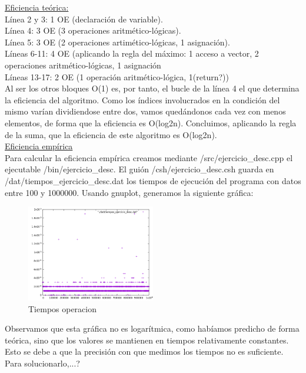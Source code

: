\documentclass[titlepage, 12pt,a4paper]{article}
\begin{document}
	\underline{Eficiencia teórica:} \\
	Línea 2 y 3: 1 OE (declaración de variable).\\
	Línea 4: 3 OE (3 operaciones aritmético-lógicas).\\
	Línea 5: 3 OE (2 operaciones artimético-lógicas, 1 asignación).\\
	Líneas 6-11: 4 OE (aplicando la regla del máximo: 1 acceso a vector, 2 operaciones aritmético-lógicas, 1 asignación\\
	Líneas 13-17: 2 OE (1 operación aritmético-lógica, 1(return?))\\

	Al ser los otros bloques O(1) es, por tanto, el bucle de la línea 4 el que determina la eficiencia del algoritmo. Como los índices involucrados en la condición del mismo varían dividiendose entre dos, vamos quedándonos cada vez con menos elementos, de forma que la eficiencia es O(log2n). Concluimos, aplicando la regla de la suma, que la eficiencia de este algoritmo es O(log2n).\\
	
	\underline{Eficiencia empírica} \\
	Para calcular la eficiencia empírica creamos mediante /src/ejercicio\_desc.cpp el ejecutable /bin/ejercicio\_desc. El guión /csh/ejercicio\_desc.csh guarda en /dat/tiempos\_ejercicio\_desc.dat los tiempos de ejecución del programa con datos entre 100 y 1000000. Usando gnuplot, generamos la siguiente gráfica:
	
	\begin{figure}[!ht]
  \caption{Tiempos operacion}
  \centering
    \includegraphics[width=0.5\textwidth]{./img/ef_pract_ej_3.png}
\end{figure}
	
	Observamos que esta gráfica no es logarítmica, como habíamos predicho de forma teórica, sino que los valores se mantienen en tiempos relativamente constantes. Esto se debe a que la precisión con que medimos los tiempos no es suficiente. Para solucionarlo,...?
	\newpage
  
\end{document}
